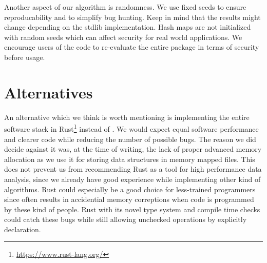 Another aspect of our algorithm is randomness. We use fixed seeds to ensure reproducability and to simplify bug hunting. Keep in mind that the results might change depending on the stdlib implementation. Hash maps are not initialized with random seeds which can affect security for real world applications. We encourage users of the code to re-evaluate the entire package in terms of security before usage.



\section{Alternatives}
\label{sec:implementation:alternatives}

An alternative which we think is worth mentioning is implementing the entire software stack in Rust\footnote{\url{https://www.rust-lang.org/}} instead of \Cpp{}. We would expect equal software performance and clearer code while reducing the number of possible bugs. The reason we did decide against it was, at the time of writing, the lack of proper advanced memory allocation as we use it for storing data structures in memory mapped files. This does not prevent us from recommending Rust as a tool for high performance data analysis, since we already have good experience while implementing other kind of algorithms. Rust could especially be a good choice for less-trained programmers since \Cpp{} often results in accidential memory correptions when code is programmed by these kind of people. Rust with its novel type system and compile time checks could catch these bugs while still allowing unchecked operations by explicitly declaration.
